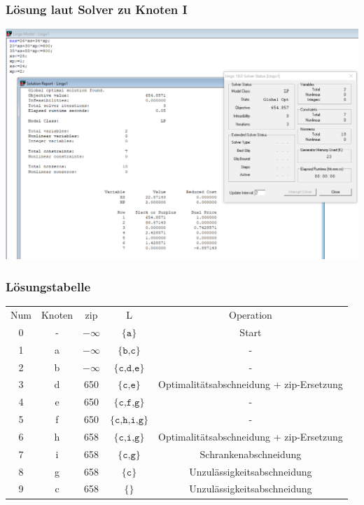 \documentclass[a4paper,11pt]{article}
\begin{document}
\subsubsection*{Lösung laut Solver zu Knoten I}
\begin{centering}
	\includegraphics[width=1\linewidth]{src/blatt_5_aufgabe_2_teilaufgabe_b_knoten_i_loesung_solver.png}
\end{centering}

\subsubsection*{Lösungstabelle}
    \begin{tabular}{ c c c c c }
        Num & Knoten & zip & L & Operation \\
        0 & - & $-\infty$ & $\texttt{\{a\}}$ & Start \\
        1 & a & $-\infty$ & $\texttt{\{b,c\}}$ & - \\
        2 & b & $-\infty$ & $\texttt{\{c,d,e\}}$ & - \\
        3 & d & 650 & $\texttt{\{c,e\}}$ & Optimalitätsabschneidung + zip-Ersetzung \\
        4 & e & 650 & $\texttt{\{c,f,g\}}$ & - \\
        5 & f & 650 & $\texttt{\{c,h,i,g\}}$ & - \\
        6 & h & 658 & $\texttt{\{c,i,g\}}$  & Optimalitätsabschneidung + zip-Ersetzung \\
        7 & i & 658 & $\texttt{\{c,g\}}$ & Schrankenabschneidung \\
        8 & g & 658 & $\texttt{\{c\}}$ & Unzulässigkeitsabschneidung \\
        9 & c & 658 & $\texttt{\{\}}$ & Unzulässigkeitsabschneidung \\
    \end{tabular}
\end{document}

